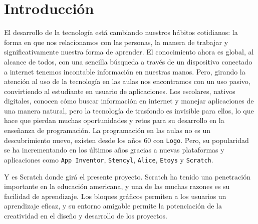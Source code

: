 \documentclass[a4paper, 12pt]{book}
\begin{document}
\tableofcontents
\cleardoublepage
\listoffigures %



\cleardoublepage
\chapter{Introducción}
\label{sec:intro} %

El desarrollo de la tecnología está cambiando nuestros hábitos cotidianos: la forma
en que nos relacionamos con las personas, la manera de trabajar y significativamente
nuestra forma de aprender. El conocimiento ahora es global, al alcance de todos, con
una sencilla búsqueda a través de un dispositivo conectado a internet tenemos incontable
información en nuestras manos. Pero, girando la atención al uso de la tecnología en las 
aulas nos encontramos con un uso pasivo, convirtiendo al estudiante en usuario de 
aplicaciones. Los escolares, nativos digitales, conocen cómo buscar información en internet 
y manejar aplicaciones de una manera natural, pero la tecnología de trasfondo es invisible 
para ellos, lo que hace que pierdan muchas oportunidades y retos para su desarrollo en la
enseñanza de programación.
La programación en las aulas no es un descubrimiento nuevo, existen desde los años 60  con 
\texttt{Logo}. Pero, su popularidad se ha incrementando en los últimos años gracias a nuevas 
plataformas y aplicaciones como \texttt{App Inventor}, \texttt{Stencyl}, \texttt{Alice}, 
\texttt{Etoys} y \texttt{Scratch}.

Y es Scratch donde girá el presente proyecto. Scratch ha tenido una penetración importante 
en la educación americana, y una de las muchas razones es su facilidad de aprendizaje. Los
bloques gráficos permiten a los usuarios un aprendizaje eficaz, y su entorno amigable permite 
la potenciación de la creatividad en el diseño y desarrollo de los proyectos.
\end{document}
